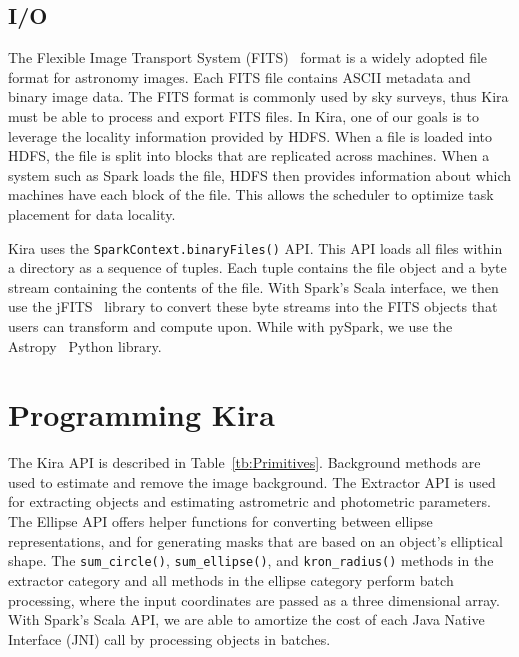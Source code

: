 \documentclass[10pt,journal,compsoc]{IEEEtran}
\begin{document}
\subsection{I/O}
\label{sec:Design-I/O}
The Flexible Image Transport System (FITS)~\cite{wells81} format is a widely adopted file format for astronomy
images. Each FITS file contains ASCII metadata and binary image data.
The FITS format is commonly used by sky surveys, thus Kira must be able to process and export FITS files.
In Kira, one of our goals is to leverage the locality information provided by HDFS. When a file is loaded into 
HDFS, the file is split into blocks that are replicated across machines. When a system such as Spark loads the file, 
HDFS then provides information about which machines have each block of the file. This allows the
scheduler to optimize task placement for data locality.


Kira uses the \texttt{SparkContext.binaryFiles()} API.
This API loads all files within a directory as a sequence of tuples. 
Each tuple contains the file object and a byte stream containing the contents of the file. 
With Spark's Scala interface, we then use the jFITS~\cite{jfits} library to convert these byte streams 
into the FITS objects that users can transform and compute upon. 
While with pySpark, we use the Astropy~\cite{astropy13} Python library.


\section{Programming Kira}
\label{sec:Programming}
The Kira API is described in Table~\ref{tb:Primitives}. 
Background methods are used to estimate and remove the image background. The Extractor
API is used for extracting objects and estimating astrometric and photometric parameters. The Ellipse API offers helper
functions for converting between ellipse representations, and for generating masks that are based on an object's elliptical
shape. The \texttt{sum\_circle()}, \texttt{sum\_ellipse()}, and \texttt{kron\_radius()} methods in the extractor category and all
methods in the ellipse category perform batch processing, where the input coordinates are passed as a three dimensional array. 
With Spark's Scala API, we are able to amortize the cost of each Java Native Interface (JNI) call  by processing objects in batches.
\end{document}
